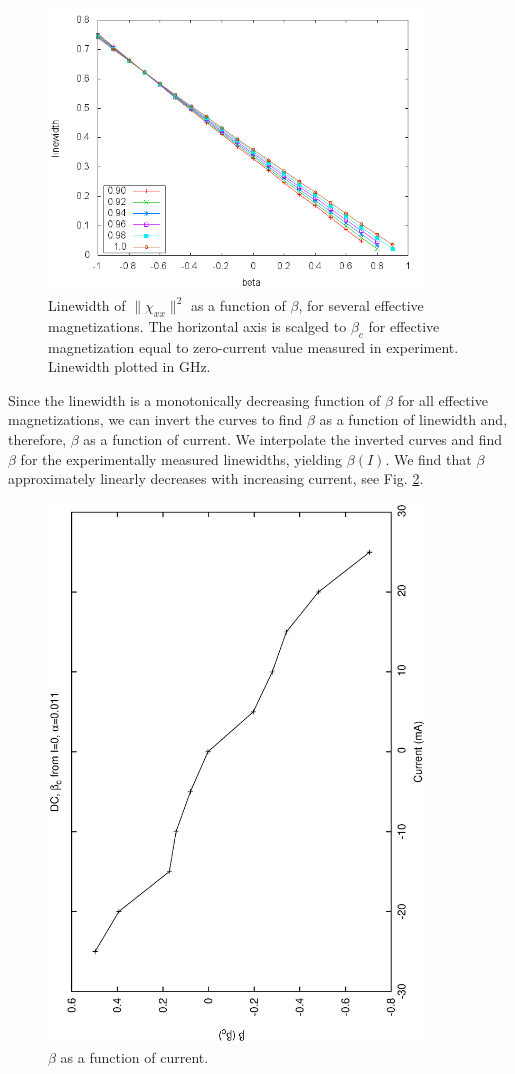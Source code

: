 \documentclass{article}
\begin{document}
\begin{figure}
  \centering
  \includegraphics[angle=0,width=100mm]{linewidth_beta.png}
  \caption{Linewidth of $\| \chi_{xx} \|^2$ as a function of $\beta$, for several effective magnetizations. The horizontal axis is scalged to $\beta_{c}$ for effective magnetization equal to zero-current value measured in experiment. Linewidth plotted in GHz. \label{linewidth_beta}}
\end{figure}

Since the linewidth is a monotonically decreasing function of $\beta$ for all effective magnetizations, we can invert the curves to find $\beta$ as a function of linewidth and, therefore, $\beta$ as a function of current. 
We interpolate the inverted curves and find $\beta$ for the experimentally measured linewidths, yielding $\beta \left( I \right)$.
We find that $\beta$ approximately linearly decreases with increasing current, see Fig. \ref{current_beta_dc}.

\begin{figure}
  \centering
  \includegraphics[angle=-90,width=100mm]{current_beta_dc.eps}
  \caption{$\beta$ as a function of current. \label{current_beta_dc}}
\end{figure}
\end{document}
